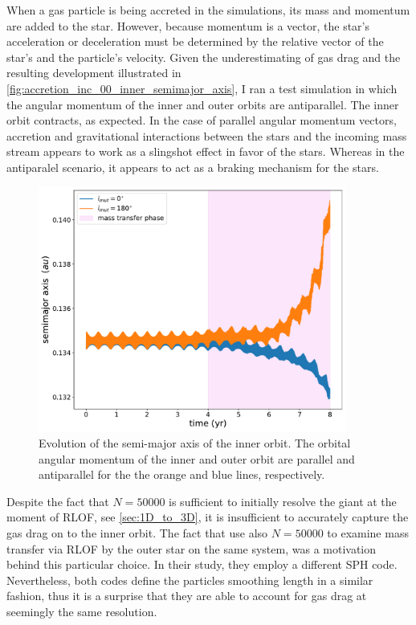 When a gas particle is being accreted in the simulations, its mass and momentum are added to the star. However, because momentum is a vector, the star's acceleration or deceleration must be determined by the relative vector of the star's and the particle's velocity. Given the underestimating of gas drag and the resulting development illustrated in \cref{fig:accretion_inc_00_inner_semimajor_axis}, I ran a test simulation in which the angular momentum of the inner and outer orbits are antiparallel. The inner orbit contracts, as expected. In the case of parallel angular momentum vectors, accretion and gravitational interactions between the stars and the incoming mass stream appears to work as a slingshot effect in favor of the stars. Whereas in the antiparalel scenario, it appears to act as a braking mechanism for the stars.
\begin{figure}[!htb]
    \centering
    \includegraphics[width=0.9\textwidth]{Thesis/graphs/accretion_inc_00_retro_inner_semimajor_axis.pdf}
    \caption{Evolution of the semi-major axis of the inner orbit. The orbital angular momentum of the inner and outer orbit are parallel and antiparallel for the the orange and blue lines, respectively.}
    \label{fig:retro}
\end{figure}

Despite the fact that $N=50000$ is sufficient to initially resolve the giant at the moment of RLOF, see \cref{sec:1D_to_3D}, it is insufficient to accurately capture the gas drag on to the inner orbit. The fact that \cite{de2014evolution} use also $N=50000$ to examine mass transfer via RLOF by the outer star on the same system, was a motivation behind this particular choice. In their study, they employ a different SPH code. Nevertheless, both codes define the particles smoothing length in a similar fashion, thus it is a surprise that they are able to account for gas drag at seemingly the same resolution. 

